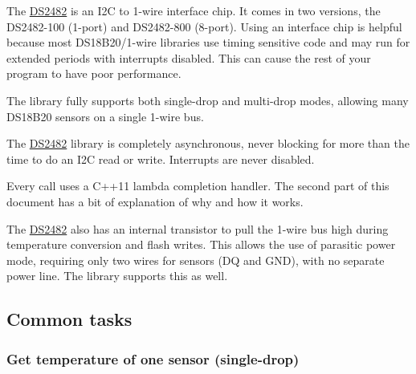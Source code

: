 The \mbox{\hyperlink{class_d_s2482}{D\+S2482}} is an I2C to 1-\/wire interface chip. It comes in two versions, the D\+S2482-\/100 (1-\/port) and D\+S2482-\/800 (8-\/port). Using an interface chip is helpful because most D\+S18\+B20/1-\/wire libraries use timing sensitive code and may run for extended periods with interrupts disabled. This can cause the rest of your program to have poor performance.

The library fully supports both single-\/drop and multi-\/drop modes, allowing many D\+S18\+B20 sensors on a single 1-\/wire bus.

The \mbox{\hyperlink{class_d_s2482}{D\+S2482}} library is completely asynchronous, never blocking for more than the time to do an I2C read or write. Interrupts are never disabled.

Every call uses a C++11 lambda completion handler. The second part of this document has a bit of explanation of why and how it works.

The \mbox{\hyperlink{class_d_s2482}{D\+S2482}} also has an internal transistor to pull the 1-\/wire bus high during temperature conversion and flash writes. This allows the use of parasitic power mode, requiring only two wires for sensors (DQ and G\+ND), with no separate power line. The library supports this as well.

\subsection*{Common tasks}

\subsubsection*{Get temperature of one sensor (single-\/drop)}


